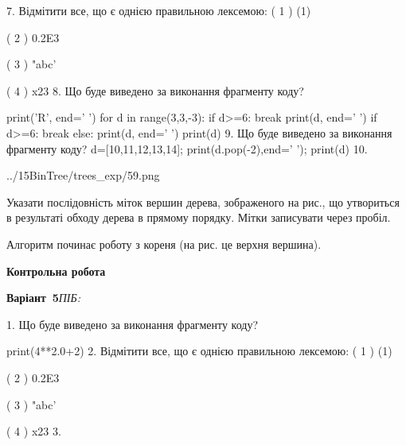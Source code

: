 \documentclass[11pt]{article}
\begin{document}
\vspace{5mm}
7. %
Відмітити все, що є однією правильною лексемою:
( 1 ) (1)

( 2 ) 0.2E3

( 3 ) "abc'

( 4 ) x23
\vspace{5mm}
8. Що буде виведено за виконання фрагменту коду?

print('R', end=' ')
for d in range(3,3,-3):
    if d>=6:
        break
        print(d, end=' ')
    if d>=6:
        break
    else:
        print(d, end=' ')
    print(d)
\vspace{5mm}
9. Що буде виведено за виконання фрагменту коду?
d=[10,11,12,13,14]; print(d.pop(-2),end=' '); print(d)\vspace{5mm}
10. 

\begin{center}
	{../15BinTree/trees_exp/59.png}
\end{center}
Указати послідовність міток вершин дерева, зображеного на рис., що утвориться в результаті обходу дерева в прямому порядку. Мітки записувати через пробіл.\par Алгоритм починає роботу з кореня (на рис. це верхня вершина).
\vspace{5mm}










\newpage

\newpage

{\large\textbf{Контрольна робота}}

\textbf{Варіант \No\,5}\hfill \textit{ПІБ:}\,\underline{\hspace{60mm}}
\vspace{4mm}

1. Що буде виведено за виконання фрагменту коду?

print(4**2.0+2)
\vspace{5mm}
2. %
Відмітити все, що є однією правильною лексемою:
( 1 ) (1)

( 2 ) 0.2E3

( 3 ) "abc'

( 4 ) x23
\vspace{5mm}
3. 
\end{document}
